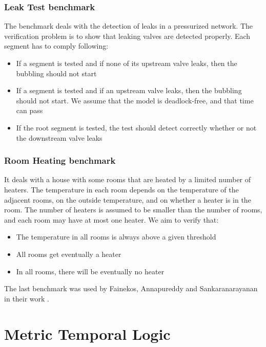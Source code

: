 \subsubsection{Leak Test benchmark}

The benchmark deals with the detection of leaks in a pressurized network. The verification problem is to show that leaking valves are detected properly. Each segment has to comply following:

\begin{itemize}
    \item If a segment is tested and if none of its upstream valve leaks, then the bubbling should not start
    \item If a segment is tested and if an upstream valve leaks, then the bubbling should not start. We assume that the model is deadlock-free, and that time can pass
    \item If the root segment is tested, the test should detect correctly whether or not the downstream valve leaks
\end{itemize}

\subsubsection{Room Heating benchmark}

It deals with a house with some rooms that are heated by a limited number of heaters. The temperature in each room depends on the temperature of the adjacent rooms, on the outside temperature, and on whether a heater is in the room. The number of heaters is assumed to be smaller than the number of rooms, and each room may have at most one heater. We aim to verify that:

\begin{itemize}
    \item The temperature in all rooms is always above a given threshold
    \item All rooms get eventually a heater
    \item In all rooms, there will be eventually no heater
\end{itemize}

The last benchmark was used by Fainekos, Annapureddy and Sankaranarayanan in their work \cite{Fainekos:sTaLiRo}.

\section{Metric Temporal Logic}

